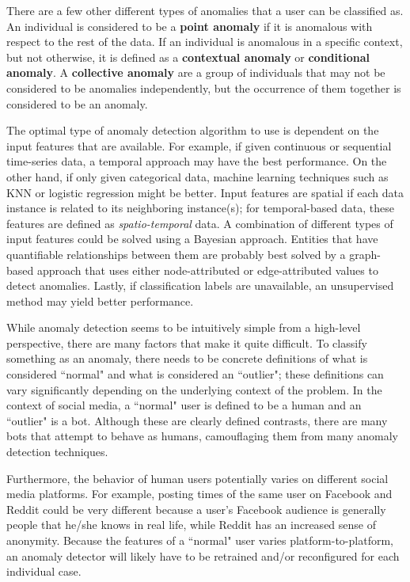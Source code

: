 \documentclass[11pt, oneside]{article}   	%
\begin{document}
\quad There are a few other different types of anomalies that a user can be classified as.
An individual is considered to be a \textbf{point anomaly} if it is anomalous with respect to the rest of the data.
If an individual is anomalous in a specific context, but not otherwise, it is defined as a \textbf{contextual anomaly} or \textbf{conditional anomaly}.
A \textbf{collective anomaly} are a group of individuals that may not be considered to be anomalies independently, but the occurrence of them together is considered to be an anomaly.

\quad The optimal type of anomaly detection algorithm to use is dependent on the input features that are available.
For example, if given continuous or sequential time-series data, a temporal approach may have the best performance.
On the other hand, if only given categorical data, machine learning techniques such as KNN or logistic regression might be better.
Input features are spatial if each data instance is related to its neighboring instance(s); for temporal-based data, these features are defined as \textit{spatio-temporal} data.
A combination of different types of input features could be solved using a Bayesian approach.
Entities that have quantifiable relationships between them are probably best solved by a graph-based approach that uses either node-attributed or edge-attributed values to detect anomalies.
Lastly, if classification labels are unavailable, an unsupervised method may yield better performance.

\quad While anomaly detection seems to be intuitively simple from a high-level perspective, there are many factors that make it quite difficult.
To classify something as an anomaly, there needs to be concrete definitions of what is considered ``normal" and what is considered an ``outlier"; these definitions can vary significantly depending on the underlying context of the problem.
In the context of social media, a ``normal" user is defined to be a human and an ``outlier" is a bot.
Although these are clearly defined contrasts, there are many bots that attempt to behave as humans, camouflaging them from many anomaly detection techniques.

\quad Furthermore, the behavior of human users potentially varies on different social media platforms.
For example, posting times of the same user on Facebook and Reddit could be very different because a user's Facebook audience is generally people that he/she knows in real life, while Reddit has an increased sense of anonymity.
Because the features of a ``normal" user varies platform-to-platform, an anomaly detector will likely have to be retrained and/or reconfigured for each individual case.
\end{document}
